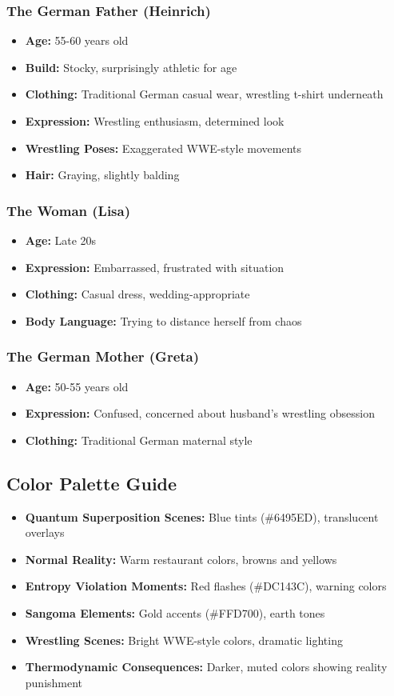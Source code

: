 \documentclass[12pt,a4paper]{article}
\begin{document}
\subsubsection{The German Father (Heinrich)}
\begin{itemize}
\item \textbf{Age:} 55-60 years old
\item \textbf{Build:} Stocky, surprisingly athletic for age
\item \textbf{Clothing:} Traditional German casual wear, wrestling t-shirt underneath
\item \textbf{Expression:} Wrestling enthusiasm, determined look
\item \textbf{Wrestling Poses:} Exaggerated WWE-style movements
\item \textbf{Hair:} Graying, slightly balding
\end{itemize}

\subsubsection{The Woman (Lisa)}
\begin{itemize}
\item \textbf{Age:} Late 20s
\item \textbf{Expression:} Embarrassed, frustrated with situation
\item \textbf{Clothing:} Casual dress, wedding-appropriate
\item \textbf{Body Language:} Trying to distance herself from chaos
\end{itemize}

\subsubsection{The German Mother (Greta)}
\begin{itemize}
\item \textbf{Age:} 50-55 years old
\item \textbf{Expression:} Confused, concerned about husband's wrestling obsession
\item \textbf{Clothing:} Traditional German maternal style
\end{itemize}

\subsection{Color Palette Guide}
\begin{itemize}
\item \textbf{Quantum Superposition Scenes:} Blue tints (\#6495ED), translucent overlays
\item \textbf{Normal Reality:} Warm restaurant colors, browns and yellows
\item \textbf{Entropy Violation Moments:} Red flashes (\#DC143C), warning colors
\item \textbf{Sangoma Elements:} Gold accents (\#FFD700), earth tones
\item \textbf{Wrestling Scenes:} Bright WWE-style colors, dramatic lighting
\item \textbf{Thermodynamic Consequences:} Darker, muted colors showing reality punishment
\end{itemize}
\end{document}
